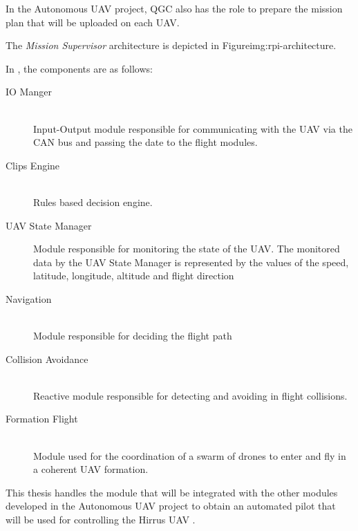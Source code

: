 In the Autonomous UAV project, QGC also has the role to prepare the mission plan
that will be uploaded on each UAV.

The \textit {Mission Supervisor} architecture is depicted in  
{Figure}{img:rpi-architecture}.

\newpage
In , the components are as
follows:
\begin{description}
\item [IO Manger] \hfill \\
Input-Output module responsible for communicating with the UAV via the CAN bus 
and passing the date to the flight modules.
\item [Clips Engine] \hfill \\
Rules based decision engine.
\item [UAV State Manager] Module responsible for monitoring the state of the UAV.
The monitored data by the UAV State Manager is represented by the values
of the speed, latitude, longitude, altitude and flight direction
\item [Navigation] \hfill \\
Module responsible for deciding the flight path
\item [Collision Avoidance] \hfill \\
Reactive module responsible for detecting and avoiding in flight collisions.
\item [Formation Flight] \hfill \\
Module used for the coordination of a swarm of drones to enter and fly in
a coherent UAV formation.
\end{description}

This thesis handles the \project module that will be integrated with the other
modules developed in the Autonomous UAV project to obtain an automated pilot
that will be used for controlling the Hirrus UAV \cite{hirrus}.

